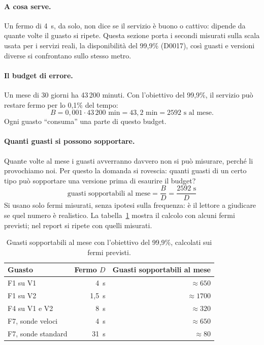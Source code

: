 \paragraph{A cosa serve.} Un fermo di 4~s, da solo, non dice se il servizio è buono o cattivo: dipende da quante volte il guasto si ripete. Questa sezione porta i secondi misurati sulla scala usata per i servizi reali, la disponibilità del 99,9\% (D0017), così guasti e versioni diverse si confrontano sullo stesso metro.

\paragraph{Il budget di errore.} Un mese di 30 giorni ha 43\,200 minuti. Con l'obiettivo del 99,9\%, il servizio può restare fermo per lo 0,1\% del tempo:
\[
B = 0{,}001 \cdot 43\,200 \text{ min} = 43{,}2 \text{ min} = 2592 \text{ s al mese.}
\]
Ogni guasto ``consuma'' una parte di questo budget.

\paragraph{Quanti guasti si possono sopportare.} Quante volte al mese i guasti avverranno davvero non si può misurare, perché li provochiamo noi. Per questo la domanda si rovescia: quanti guasti di un certo tipo può sopportare una versione prima di esaurire il budget?
\[
\text{guasti sopportabili al mese} = \frac{B}{D} = \frac{2592 \text{ s}}{D}
\]
Si usano solo fermi misurati, senza ipotesi sulla frequenza: è il lettore a giudicare se quel numero è realistico. La tabella~\ref{tab:sopportabili} mostra il calcolo con alcuni fermi previsti; nel report si ripete con quelli misurati.

\begin{table}[htbp]
\centering
\caption{Guasti sopportabili al mese con l'obiettivo del 99,9\%, calcolati sui fermi previsti.}
\label{tab:sopportabili}
\begin{tabular}{@{}lrr@{}}
\toprule
\textbf{Guasto} & \textbf{Fermo $D$} & \textbf{Guasti sopportabili al mese} \\
\midrule
F1 su V1 & 4~s & $\approx 650$ \\
F1 su V2 & 1,5~s & $\approx 1700$ \\
F4 su V1 e V2 & 8~s & $\approx 320$ \\
F7, sonde veloci & 4~s & $\approx 650$ \\
F7, sonde standard & 31~s & $\approx 80$ \\
\bottomrule
\end{tabular}
\end{table}

